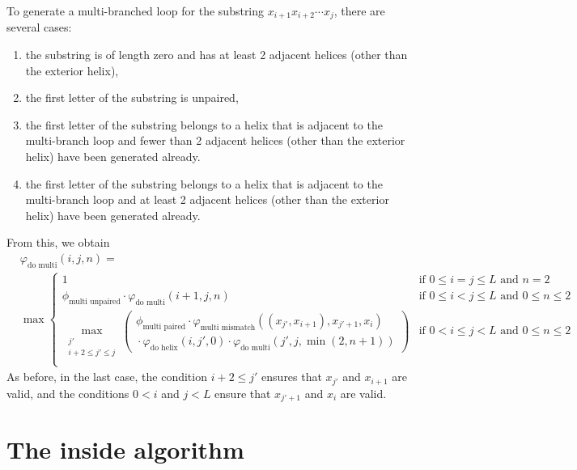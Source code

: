 \documentclass{article}
\newcommand{\multimismatch}{\varphi_\text{multi mismatch}}
\newcommand{\domulti}{\varphi_\text{do multi}}
\newcommand{\multiunpaired}{\phi_\text{multi unpaired}}
\newcommand{\multipaired}{\phi_\text{multi paired}}
\newcommand{\dohelix}{\varphi_\text{do helix}}
\begin{document}
  To generate a multi-branched loop for the substring $x_{i+1} x_{i+2} \cdots x_j$, there are several cases:
  \begin{enumerate}
  \item the substring is of length zero and has at least 2 adjacent helices (other than the exterior helix),
  \item the first letter of the substring is unpaired,
  \item the first letter of the substring belongs to a helix that is adjacent to the multi-branch loop and fewer than
    2 adjacent helices (other than the exterior helix) have been generated already.
  \item the first letter of the substring belongs to a helix that is adjacent to the multi-branch loop and at least
    2 adjacent helices (other than the exterior helix) have been generated already.
  \end{enumerate}
  From this, we obtain
  \begin{align*}
    &\domulti(i,j,n) = \\
    &\max \begin{cases}
      1 & \text{if $0 \le i=j \le L$ and $n=2$} \\
      \multiunpaired \cdot \domulti(i+1,j,n) & \text{if $0 \le i < j \le L$ and $0 \le n \le 2$} \\
      \displaystyle \max_{\substack{j' \\ i+2 \le j' \le j}} 
      \left(
      \begin{matrix}
	\multipaired \cdot \multimismatch((x_{j'},x_{i+1}),x_{j'+1},x_i) \\
	{} \cdot \dohelix(i,j',0) \cdot \domulti(j',j,\min(2,n+1))
      \end{matrix}
      \right) & \text{if $0 < i \le j < L$ and $0 \le n \le 2$} \\
    \end{cases}
  \end{align*}
  As before, in the last case, the condition $i+2 \le j'$ ensures that $x_{j'}$ and $x_{i+1}$ 
  are valid, and the conditions $0 < i$ and $j < L$ ensure that $x_{j'+1}$ and $x_i$ are valid.

  \newpage
  \section{The inside algorithm}
  \label{sec:inside}
\end{document}
